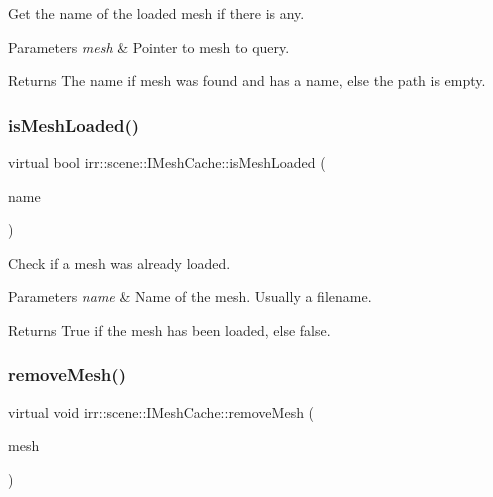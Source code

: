 Get the name of the loaded mesh if there is any. 


\begin{DoxyParams}{Parameters}
{\em mesh} & Pointer to mesh to query. \\
\hline
\end{DoxyParams}
\begin{DoxyReturn}{Returns}
The name if mesh was found and has a name, else the path is empty. 
\end{DoxyReturn}
\mbox{\label{classirr_1_1scene_1_1IMeshCache_a42a13fab5b76ab7142a1d47dac80548b}} 
\subsubsection{\texorpdfstring{is\+Mesh\+Loaded()}{isMeshLoaded()}}
{\footnotesize\ttfamily virtual bool irr\+::scene\+::\+I\+Mesh\+Cache\+::is\+Mesh\+Loaded (\begin{DoxyParamCaption}\item[{const \hyperlink{namespaceirr_1_1io_ab1bdc45edb3f94d8319c02bc0f840ee1}{io\+::path} \&}]{name }\end{DoxyParamCaption})\hspace{0.3cm}{\ttfamily [pure virtual]}}



Check if a mesh was already loaded. 


\begin{DoxyParams}{Parameters}
{\em name} & Name of the mesh. Usually a filename. \\
\hline
\end{DoxyParams}
\begin{DoxyReturn}{Returns}
True if the mesh has been loaded, else false. 
\end{DoxyReturn}
\mbox{\label{classirr_1_1scene_1_1IMeshCache_aa82078b06fdcaa332b44a59e4027f921}} 
\subsubsection{\texorpdfstring{remove\+Mesh()}{removeMesh()}}
{\footnotesize\ttfamily virtual void irr\+::scene\+::\+I\+Mesh\+Cache\+::remove\+Mesh (\begin{DoxyParamCaption}\item[{const \hyperlink{classirr_1_1scene_1_1IMesh}{I\+Mesh} $\ast$const}]{mesh }\end{DoxyParamCaption})\hspace{0.3cm}{\ttfamily [pure virtual]}}



